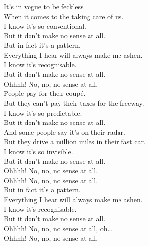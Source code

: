 
\label{album:paper-mache-dream-balloon}




It's in vogue to be feckless \\
When it comes to the  taking care of us. \\
I know it's so conventional. \\
But it don't make no sense at all. \\

But in fact it's a pattern. \\
Everything I hear will always make me ashen. \\
I know it's recognisable. \\
But it don't make no sense at all. \\

Ohhhh! No, no, no sense at all. \\

People pay for their coupé. \\
But they can't pay their taxes for the freeway. \\
I know it's so predictable. \\
But it don't make no sense at all. \\

And some people say it's on their radar. \\
But they drive a million miles in their fast car. \\
I know it's so invisible. \\
But it don't make no sense at all. \\

Ohhhh! No, no, no sense at all. \\
Ohhhh! No, no, no sense at all. \\

But in fact it's a pattern. \\
Everything I hear will always make me ashen. \\
I know it's recognisable. \\
But it don't make no sense at all. \\

Ohhhh! No, no, no sense at all, oh… \\
Ohhhh! No, no, no sense at all. \\

